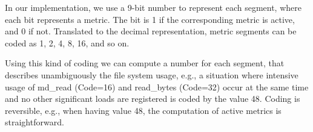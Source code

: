 \documentclass[]{llncs}
\begin{document}
In our implementation, we use a 9-bit number to represent each segment, where each bit represents a metric.
The bit is 1 if the corresponding metric is active, and 0 if not.
Translated to the decimal representation, metric segments can be coded as 1, 2, 4, 8, 16, and so on.

Using this kind of coding we can compute a number for each segment, that describes unambiguously the file system usage, e.g., a situation where intensive usage of md\_read (Code=16) and read\_bytes (Code=32) occur at the same time and no other significant loads are registered is coded by the value 48.
Coding is reversible, e.g., when having value 48, the computation of active metrics is straightforward.



\end{document}
